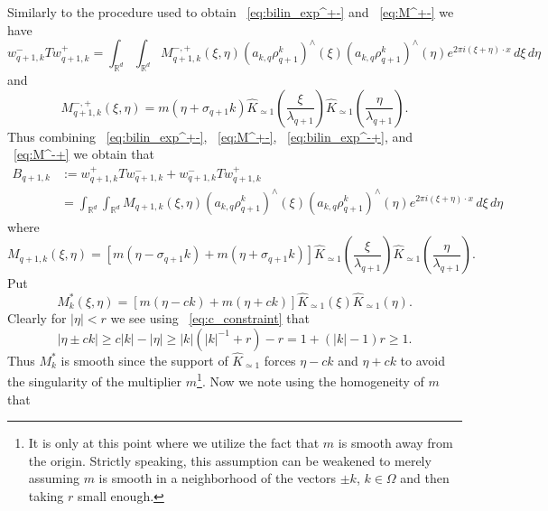 \documentclass[12pt,reqno,letterpaper]{amsart}
\numberwithin{equation}{section}
\newcommand{\1}{{\bf 1}}
\newcommand{\2}{{\bf 2}}
\newcommand{\R}{\mathbb R}
\theoremstyle{remark}
\theoremstyle{remark}
\begin{document}
Similarly to the procedure used to obtain ~\eqref{eq:bilin_exp^+-} and ~\eqref{eq:M^+-} we have 
\begin{equation}\label{eq:bilin_exp^-+}
    w_{q+1,k}^- Tw_{q+1,k}^+ = \int_{\R^d} \int_{\R^d} M^{-,+}_{q+1,k}(\xi,\eta) \left(a_{k,q} \rho^k_{q+1}\right)^{\wedge}(\xi) \left(a_{k,q} \rho^k_{q+1}\right)^{\wedge}(\eta) e^{2\pi i (\xi + \eta) \cdot x}\, d\xi\, d\eta
\end{equation}
and
\begin{equation}\label{eq:M^-+}
     M_{q+1,k}^{-,+}(\xi,\eta) = m(\eta + \sigma_{q+1}k) \hat{K}_{\simeq 1}\left(\frac{\xi}{\lambda_{q+1}}\right) \hat{K}_{\simeq 1}\left(\frac{\eta}{\lambda_{q+1}}\right).
\end{equation}
Thus combining ~\eqref{eq:bilin_exp^+-}, ~\eqref{eq:M^+-}, ~\eqref{eq:bilin_exp^-+}, and ~\eqref{eq:M^-+} we obtain that
\begin{equation}\label{eq:bilin_exp}
\begin{split}
    B_{q+1,k} &:= w_{q+1,k}^+ Tw_{q+1,k}^- + w_{q+1,k}^- Tw_{q+1,k}^+\\
    &= \int_{\R^d} \int_{\R^d} M_{q+1,k}(\xi,\eta) \left(a_{k,q} \rho^k_{q+1}\right)^{\wedge}(\xi) \left(a_{k,q} \rho^k_{q+1}\right)^{\wedge}(\eta) e^{2\pi i (\xi + \eta) \cdot x}\, d\xi\, d\eta
    \end{split}
\end{equation}
where
\begin{equation}\label{eq:Mq+1k}
    M_{q+1,k}(\xi,\eta) = \left[m\left(\eta - \sigma_{q+1}k\right) + m\left(\eta + \sigma_{q+1}k\right)\right] \hat{K}_{\simeq 1}\left(\frac{\xi}{\lambda_{q+1}}\right) \hat{K}_{\simeq 1}\left(\frac{\eta}{\lambda_{q+1}}\right).
\end{equation}
Put
\begin{equation}\label{eq:Mq+1^*}
    M^*_k(\xi,\eta) = \left[m\left(\eta - ck\right) + m\left(\eta + ck\right)\right] \hat{K}_{\simeq 1}\left(\xi\right) \hat{K}_{\simeq 1}\left(\eta\right).
\end{equation}
Clearly for $|\eta| < r$ we see using ~\eqref{eq:c_constraint} that
$$
|\eta \pm ck| \geq c|k| - |\eta| \geq |k|\left(|k|^{-1} + r\right) - r = 1 + \left(|k| - 1\right)r \geq 1.
$$
Thus $M_k^*$ is smooth since the support of $\hat{K}_{\simeq 1}$ forces $\eta - ck$ and $\eta + ck$ to avoid the singularity of the multiplier $m$\footnote{It is only at this point where we utilize the fact that $m$ is smooth away from the origin. Strictly speaking, this assumption can be weakened to merely assuming $m$ is smooth in a neighborhood of the vectors $\pm k$, $k \in \Omega$ and then taking $r$ small enough.\label{footnote}}. Now we note using the homogeneity of $m$ that
\end{document}
